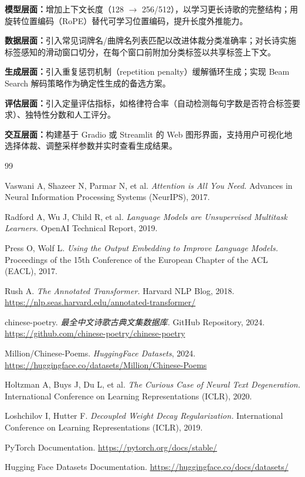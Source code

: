 \documentclass[a4paper, 12pt, centering, AutoFakeBold]{article}
\begin{document}
\textbf{模型层面：}增加上下文长度（128 $\to$ 256/512），以学习更长诗歌的完整结构；用旋转位置编码（RoPE）替代可学习位置编码，提升长度外推能力。

\textbf{数据层面：}引入常见词牌名/曲牌名列表匹配以改进体裁分类准确率；对长诗实施标签感知的滑动窗口切分，在每个窗口前附加分类标签以共享标签上下文。

\textbf{生成层面：}引入重复惩罚机制（repetition penalty）缓解循环生成；实现 Beam Search 解码策略作为确定性生成的备选方案。

\textbf{评估层面：}引入定量评估指标，如格律符合率（自动检测每句字数是否符合标签要求）、独特性分数和人工评分。

\textbf{交互层面：}构建基于 Gradio 或 Streamlit 的 Web 图形界面，支持用户可视化地选择体裁、调整采样参数并实时查看生成结果。

\newpage
\begin{thebibliography}{99}

Vaswani A, Shazeer N, Parmar N, et al.
\textit{Attention is All You Need.}
Advances in Neural Information Processing Systems (NeurIPS), 2017.

Radford A, Wu J, Child R, et al.
\textit{Language Models are Unsupervised Multitask Learners.}
OpenAI Technical Report, 2019.

Press O, Wolf L.
\textit{Using the Output Embedding to Improve Language Models.}
Proceedings of the 15th Conference of the European Chapter of the ACL (EACL), 2017.

Rush A.
\textit{The Annotated Transformer.}
Harvard NLP Blog, 2018. \url{https://nlp.seas.harvard.edu/annotated-transformer/}

chinese-poetry.
\textit{最全中文诗歌古典文集数据库.}
GitHub Repository, 2024. \url{https://github.com/chinese-poetry/chinese-poetry}

Million/Chinese-Poems.
\textit{HuggingFace Datasets}, 2024. \url{https://huggingface.co/datasets/Million/Chinese-Poems}

Holtzman A, Buys J, Du L, et al.
\textit{The Curious Case of Neural Text Degeneration.}
International Conference on Learning Representations (ICLR), 2020.

Loshchilov I, Hutter F.
\textit{Decoupled Weight Decay Regularization.}
International Conference on Learning Representations (ICLR), 2019.

PyTorch Documentation. \url{https://pytorch.org/docs/stable/}

Hugging Face Datasets Documentation. \url{https://huggingface.co/docs/datasets/}

\end{thebibliography}

\end{document}
